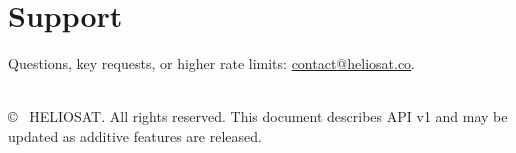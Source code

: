 \documentclass[11pt,a4paper]{article}
\begin{document}
\section{Support}

Questions, key requests, or higher rate limits:
\href{mailto:contact@heliosat.co}{contact@heliosat.co}.

\vfill
\noindent{\color{codeframe}\rule{\textwidth}{0.4pt}}\\
{\small © \the\year\ HELIOSAT. All rights reserved. This document describes API v1 and
may be updated as additive features are released.}
\end{document}
